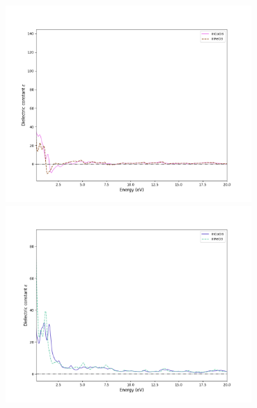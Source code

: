 \documentclass[12pt, letterpaper]{article}
\newcommand*{\1}{\hspace{1pt}}
\begin{document}
    \begin{adjustbox}{center, caption={Dielectric constants of InCoO3 and InFeO3},label={somelabel},nofloat=figure,}
        \includegraphics[width=0.7\textwidth]{dieleceng}
        \includegraphics[width=0.7\textwidth]{dielecimageng}
    \end{adjustbox}
\end{document}
